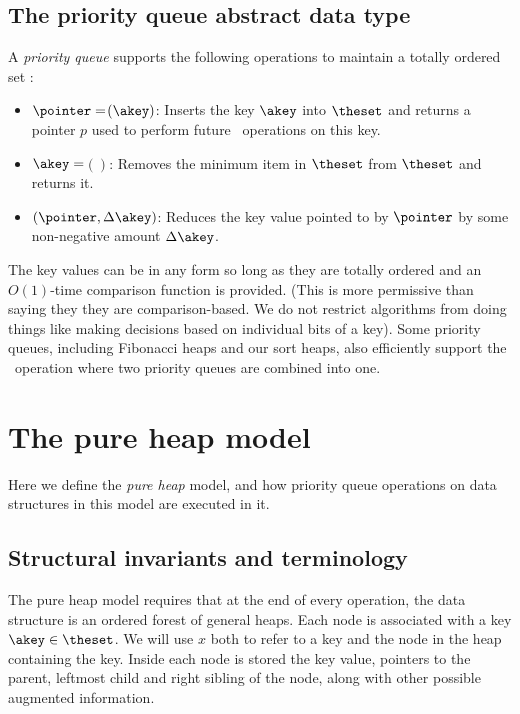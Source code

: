 \begin{fullonly}
\section{The priority queue abstract data type} 

A \emph{priority queue} supports the following operations to maintain a totally ordered set \theset:

\begin{itemize}

\item $\pointer= $\opIns$(\akey)$: Inserts the key $\akey$ into $\theset$ and returns a pointer $p$ used to perform future \opDc\ operations on this key.

\item $\akey= $\opEm$()$: Removes the minimum item in $\theset$ from $\theset$ and returns it.

\item \opDc$(\pointer, \Delta \akey)$: Reduces the key value pointed to by $\pointer$ by some non-negative amount $\Delta \akey$.

\end{itemize}

The key values can be in any form so long as they are totally ordered and an $O(1)$-time comparison function is provided. (This is more permissive than saying they they are comparison-based. We do not restrict algorithms from doing things like making decisions based on individual bits of a key). Some priority queues, including Fibonacci heaps and our sort heaps, also efficiently support the \opMg\ operation where two priority queues are combined into one.
\end{fullonly}


\section{The pure heap model} 

Here we define the \emph{pure heap} model, and how priority queue operations on data structures in this model are executed in it.

\subsection{Structural invariants and terminology}

The pure heap model requires that at the end of every operation, the data structure is an ordered forest of general heaps. 
Each node is associated with a key $\akey \in \theset$. We will use $x$ both to refer to a key and the node in the heap containing the key. Inside each node is stored the key value, pointers to the parent, leftmost child and right sibling of the node, along with other possible augmented information.

